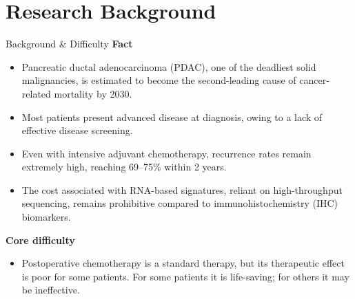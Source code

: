 \documentclass[10pt]{beamer}
\theoremstyle{plain}
\begin{document}
\section{Research Background}

\begin{frame}{Background \& Difficulty}
  \textbf{Fact}
  \begin{itemize}
    \item Pancreatic ductal adenocarcinoma (PDAC), one of the deadliest solid malignancies, is estimated to become the second-leading cause of cancer-related mortality by 2030.
    \item Most patients present advanced disease at diagnosis, owing to a lack of effective disease screening.
    \item Even with intensive adjuvant chemotherapy, recurrence rates remain extremely high, reaching 69--75\% within 2 years.
    \item The cost associated with RNA-based signatures, reliant on high-throughput sequencing, remains prohibitive compared to immunohistochemistry (IHC) biomarkers.
  \end{itemize}

  \vspace{0.4em}

  \textbf{Core difficulty}
  \begin{itemize}
    \item Postoperative chemotherapy is a standard therapy, but its therapeutic effect is poor for some patients. For some patients it is life-saving; for others it may be ineffective.
  \end{itemize}
\end{frame}
\end{document}
